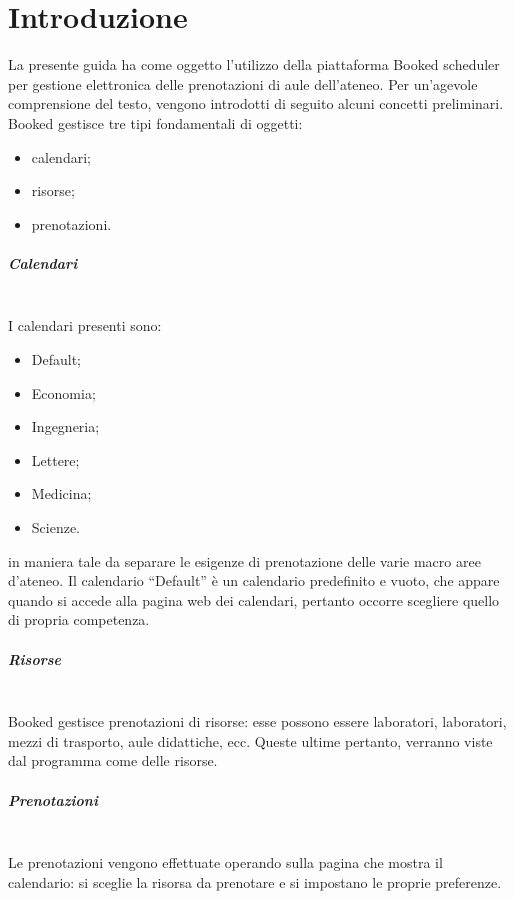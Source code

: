 \chapter{Introduzione}
La presente guida ha come oggetto l'utilizzo della piattaforma Booked scheduler
per gestione elettronica delle prenotazioni di aule dell'ateneo.
Per un'agevole comprensione del testo, vengono introdotti di seguito alcuni concetti preliminari.
Booked gestisce tre tipi fondamentali di oggetti:
\begin{itemize}
 \item calendari;
 \item risorse;
 \item prenotazioni.
\end{itemize}
\paragraph*{Calendari}\mbox{}\\ %
I calendari presenti sono:
\begin{itemize}
 \item Default;
 \item Economia;
 \item Ingegneria;
 \item Lettere;
 \item Medicina;
 \item Scienze.
\end{itemize}

in maniera tale da separare le esigenze di prenotazione delle varie macro aree d'ateneo.
Il calendario ``Default'' è un calendario predefinito e vuoto, che appare quando si accede
alla pagina web dei calendari, pertanto occorre scegliere quello di propria competenza.

\paragraph*{Risorse}\mbox{}\\ %
Booked gestisce prenotazioni di risorse: esse possono essere laboratori, laboratori,
mezzi di trasporto, aule didattiche, ecc. Queste ultime pertanto, verranno viste dal
programma come delle risorse.


\paragraph*{Prenotazioni}\mbox{}\\ %
Le prenotazioni vengono effettuate operando sulla pagina che mostra il calendario: si sceglie
la risorsa da prenotare e si impostano le proprie preferenze.